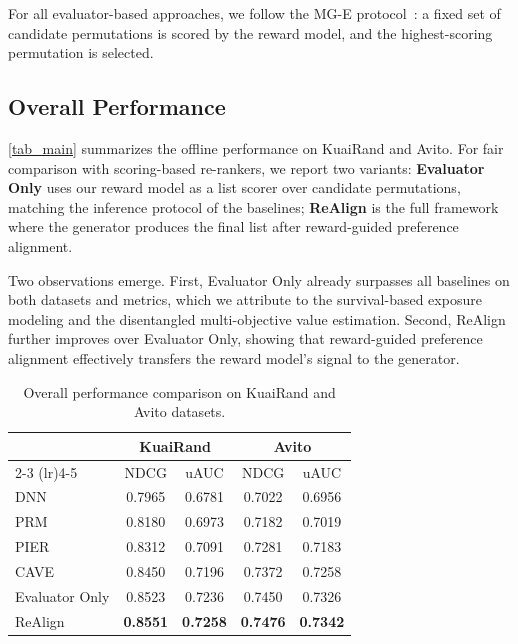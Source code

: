 \documentclass[sigconf]{acmart}
\begin{document}
For all evaluator-based approaches, we follow the MG-E protocol~\cite{yang2025comprehensive}: a fixed set of candidate permutations is scored by the reward model, and the highest-scoring permutation is selected.

\subsection{Overall Performance}
\autoref{tab_main} summarizes the offline performance on KuaiRand and Avito. For fair comparison with scoring-based re-rankers, we report two variants: \textbf{Evaluator Only} uses our reward model as a list scorer over candidate permutations, matching the inference protocol of the baselines; \textbf{ReAlign} is the full framework where the generator produces the final list after reward-guided preference alignment.

Two observations emerge. First, Evaluator Only already surpasses all baselines on both datasets and metrics, which we attribute to the survival-based exposure modeling and the disentangled multi-objective value estimation. Second, ReAlign further improves over Evaluator Only, showing that reward-guided preference alignment effectively transfers the reward model's signal to the generator.

\begin{table}[htpb]
\caption{Overall performance comparison on KuaiRand and Avito datasets.}
\label{tab_main}
\begin{tabular}{lcccc}
\toprule
  & \multicolumn{2}{c}{KuaiRand} 
  & \multicolumn{2}{c}{Avito} \\
\cmidrule(lr){2-3} \cmidrule(lr){4-5}
                 & NDCG            & uAUC            & NDCG            & uAUC            \\
\midrule
DNN              & 0.7965          & 0.6781          & 0.7022          & 0.6956          \\
PRM              & 0.8180          & 0.6973          & 0.7182          & 0.7019          \\
PIER             & 0.8312          & 0.7091          & 0.7281          & 0.7183          \\
CAVE             & 0.8450          & 0.7196          & 0.7372          & 0.7258          \\
\midrule
Evaluator Only   & 0.8523          & 0.7236          & 0.7450          & 0.7326          \\
ReAlign          & \textbf{0.8551} & \textbf{0.7258} & \textbf{0.7476} & \textbf{0.7342} \\
\bottomrule
\end{tabular}
\end{table}
\end{document}
